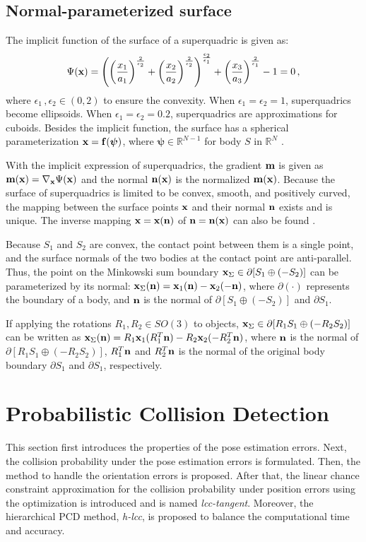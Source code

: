 \documentclass[conference]{IEEEtran}
\newcommand{\xx}{{\bf x}}
\newcommand{\mm}{{\bf m}}
\newcommand{\nn}{{\bf n}}
\begin{document}
\subsection{Normal-parameterized surface}
The implicit function of the surface of a superquadric is given as:
$$
\Psi(\xx) = \left( \left(\frac{x_1}{a_1}\right)^{\frac{2}{\epsilon_2}} + \left(\frac{x_2}{a_2}\right)^{\frac{2}{\epsilon_2}} \right)^{\frac{\epsilon_2}{\epsilon_1}} + \left(\frac{x_3}{a_3}\right)^{\frac{2}{\epsilon_1}} - 1 = 0 \, ,
$$
where $\epsilon_1\, , \epsilon_2 \in (0,2)$ to ensure the convexity. When $\epsilon_1=\epsilon_2=1$, superquadrics become ellipsoids. When $\epsilon_1=\epsilon_2=0.2$, superquadrics are approximations for cuboids. Besides the implicit function, the surface has a spherical parameterization $\xx = \mathbf{f(\boldsymbol{\psi})}$, where $\boldsymbol{\psi} \in \mathbb{R}^{N-1}$ for body $S$ in $\mathbb{R}^N$ \cite{ruan2022collision}. 

With the implicit expression of superquadrics, the gradient $\mm$ is given as $\mm(\xx) = \nabla_\xx \Psi(\xx)$ and the normal $\nn(\xx)$ is the normalized $\mm(\xx)$. Because the surface of superquadrics is limited to be convex, smooth, and positively curved, the mapping between the surface points $\xx$ and their normal $\nn$ exists and is unique. The inverse mapping $\xx=\xx(\nn)$ of $\nn=\nn(\xx)$ can also be found \cite{ruan2022collision}. 

Because $S_1$ and $S_2$ are convex, the contact point between them is a single point, and the surface normals of the two bodies at the contact point are anti-parallel. Thus, the point on the Minkowski sum boundary $\xx_\Sigma \in \partial[S_1\oplus(-S_2)]$ can be parameterized by its normal:
$\xx_\Sigma(\nn) = \xx_1(\nn) - \xx_2(-\nn)$,
where $\partial(\cdot)$ represents the boundary of a body, and $\nn$ is the normal of $\partial[S_1\oplus(-S_2)]$ and $\partial S_1$. 

If applying the rotations $R_1, R_2 \in SO(3)$ to objects, $\xx_\Sigma \in \partial[R_1S_1\oplus(-R_2S_2)]$ can be written as $\xx_\Sigma(\nn) = R_1\xx_1(R_1^T\nn)-R_2\xx_2(-R_2^T\nn)$, where $\nn$ is the normal of $\partial[R_1S_1\oplus(-R_2S_2)]$, $R_1^T\nn$ and $R_2^T\nn$ is the normal of the original body boundary $\partial S_1$ and $\partial S_1$, respectively. 


\section{Probabilistic Collision Detection}
This section first introduces the properties of the pose estimation errors. Next, the collision probability under the pose estimation errors is formulated. Then, the method to handle the orientation errors is proposed. After that, the linear chance constraint approximation for the collision probability under position errors using the optimization is introduced and is named \textit{lcc-tangent}. Moreover, the hierarchical PCD method, \textit{h-lcc}, is proposed to balance the computational time and accuracy.
\end{document}
